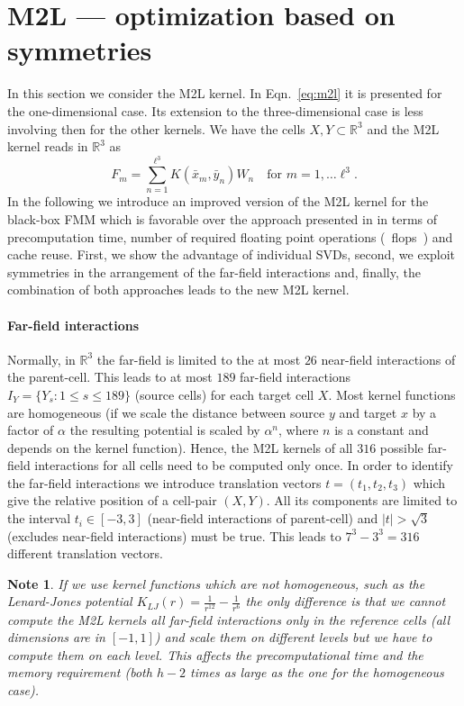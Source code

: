 \documentclass[]{article}
\theoremstyle{plain}
\newtheorem*{note}{Note}
\begin{document}
\section{M2L --- optimization based on symmetries}
\label{sec:m2l}
In this section we consider the M2L kernel. In Eqn.~\eqref{eq:m2l} it is
presented for the one-dimensional case. Its extension to the three-dimensional
case is less involving then for the other kernels. We have the cells
$X,Y\subset\mathbb{R}^3$ and the M2L kernel reads in $\mathbb{R}^3$ as
\begin{equation}
  \label{eq:m2l_3d}
  F_m = \sum_{n=1}^{\ell^3} K(\bar x_m, \bar y_n) W_n \quad \text{for }
  m=1,\dots\ell^3.
\end{equation}
In the following we introduce an improved version of the M2L kernel for the
black-box FMM which is favorable over the approach presented in
\citep{fong09a} in terms of precomputation time, number of required floating
point operations \unit{(flops)} and cache reuse. First, we show the advantage
of individual SVDs, second, we exploit symmetries in the arrangement of the
far-field interactions and, finally, the combination of both approaches leads
to the new M2L kernel.

\paragraph{Far-field interactions} Normally, in $\mathbb{R}^3$ the far-field
is limited to the at most $26$ near-field interactions of the
parent-cell. This leads to at most $189$ far-field interactions
$I_Y=\{Y_s:1\le s\le 189\}$ (source cells) for each target cell $X$. Most
kernel functions are homogeneous (if we scale the distance between source $y$
and target $x$ by a factor of $\alpha$ the resulting potential is scaled by
$\alpha^n$, where $n$ is a constant and depends on the kernel
function). Hence, the M2L kernels of all $316$ possible far-field interactions
for all cells need to be computed only once. In order to identify the
far-field interactions we introduce translation vectors $t = (t_1,t_2,t_3)$
which give the relative position of a cell-pair $(X,Y)$. All its components
are limited to the interval $t_i\in[-3,3]$ (near-field interactions of
parent-cell) and $|t|>\sqrt{3}$ (excludes near-field interactions) must be
true. This leads to $7^3-3^3=316$ different translation vectors.

\begin{note}
  If we use kernel functions which are not homogeneous, such as the
  Lenard-Jones potential $K_{LJ}(r) = \frac{1}{r^{12}} - \frac{1}{r^6}$ the
  only difference is that we cannot compute the M2L kernels all far-field
  interactions only in the reference cells (all dimensions are in $[-1,1]$)
  and scale them on different levels but we have to compute them on each
  level. This affects the precomputational time and the memory requirement
  (both $h-2$ times as large as the one for the homogeneous case).
\end{note}
\end{document}
